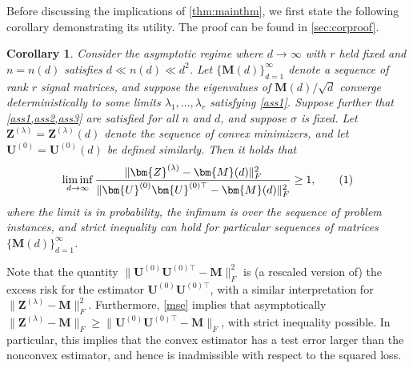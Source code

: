 \documentclass[10pt]{article}
\newcommand\numberthis{\addtocounter{equation}{1}\tag{\theequation}}
\newtheorem{corollary}{Corollary}
\theoremstyle{definition}
\begin{document}
Before discussing the implications of \cref{thm:mainthm}, we first state the following corollary demonstrating its utility.  The proof can be found in \cref{sec:corproof}.
\begin{corollary} \label{cor:maincor}
Consider the asymptotic regime where $d\to\infty$ with $r$ held fixed and $n = n(d)$ satisfies $ d \ll n(d) \ll d^2$.   Let $\{\bm{M}(d)\}_{d=1}^{\infty}$ denote a sequence of rank $r$ signal matrices, and suppose the eigenvalues of $\bm{M}(d)/\sqrt{d}$ converge deterministically to some limits $\lambda_1,\dots,\lambda_r$ satisfying \cref{ass1}.  Suppose further that \cref{ass1,ass2,ass3} are satisfied for all $n$ and $d$, and suppose $\sigma$ is fixed. Let $\bm{Z}^{(\lambda)} = \bm{Z}^{(\lambda)}(d)$ denote the sequence of convex minimizers, and let $\bm{U}^{(0)} = \bm{U}^{(0)}(d)$ be defined similarly.  
Then it holds that 
\begin{align}
  \liminf_{d\to\infty} \frac{\| \bm{Z}^{(\lambda)} - \bm{M}(d) \|_F^2}{ \| \bm{U}^{(0)}\bm{U}^{(0)\top} - \bm{M}(d) \|_F^2} \geq 1, \numberthis \label{mse}
\end{align}
where the limit is in probability, the infimum is over the sequence of problem instances, and strict inequality can hold for particular sequences of matrices $\{\bm{M}(d)\}_{d=1}^{\infty}$.  
\end{corollary}
Note that the quantity $\| \bm{U}^{(0)} \bm{U}^{(0)\top} - \bm{M} \|_F^2$ is (a rescaled version of) the excess risk for the estimator $\bm{U}^{(0)} \bm{U}^{(0)\top}$, with a similar interpretation for $\| \bm{Z}^{(\lambda)} - \bm{M} \|_F^2$.  
Furthermore, \eqref{mse} implies that asymptotically $\|\bm{Z}^{(\lambda)} - \bm{M}\|_F \geq \| \bm{U}^{(0)} \bm{U}^{(0)\top} - \bm{M}\|_F$, with strict inequality possible. In particular, this implies that the convex estimator has a test error larger than the nonconvex estimator, and hence is inadmissible with respect to the squared loss. 
\end{document}
